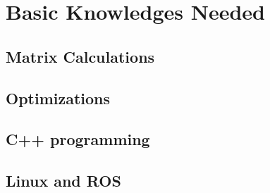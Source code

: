  

\chapter[Supplements]{Basic Knowledges Needed}

\section{Matrix Calculations}
\section{Optimizations}
\section{C++ programming}
\section{Linux and ROS}

